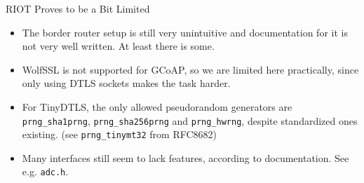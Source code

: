\documentclass[10pt, xcolor=svgnames]{beamer}
\begin{document}
\begin{frame}{RIOT Proves to be a Bit Limited}
    \begin{itemize}
        \item The border router setup is still very unintuitive and documentation for it is not very well written. At least there is some.
        \item WolfSSL is not supported for GCoAP, so we are limited here practically, since only using DTLS sockets makes the task harder.
        \item For TinyDTLS, the only allowed pseudorandom generators are \texttt{prng\_sha1prng}, \texttt{prng\_sha256prng} and \texttt{prng\_hwrng}, despite standardized ones existing. (see \texttt{prng\_tinymt32} from RFC8682)
        \item Many interfaces still seem to lack features, according to documentation. See e.g. \texttt{adc.h}.
    \end{itemize}
\end{frame}
\end{document}

